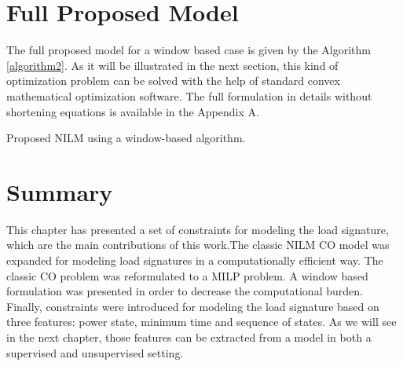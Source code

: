 \section{Full Proposed Model}

The full proposed model for a window based case is given by the Algorithm \ref{algorithm2}. As it will be illustrated in the next section, this kind of optimization problem can be solved with the help of standard convex mathematical optimization software. The full formulation in details without shortening equations is available in the Appendix A. 

\begin{algorithm}[htb]\label{algorithm2}
\SetAlgoLined
\caption{Proposed NILM using a window-based algorithm.}
\end{algorithm}

\vfill


\section{Summary}
This chapter has presented a set of constraints for modeling the load signature, which are the main contributions of this work.The classic NILM CO model was expanded for modeling load signatures in a computationally efficient way. The classic CO problem was reformulated to a MILP problem. A window based formulation was presented in order to decrease the computational burden. Finally, constraints were introduced for modeling the load signature based on three features: power state, minimum time and sequence of states. As we will see in the next chapter, those features can be extracted from a model in both a supervised and unsupervised setting. 